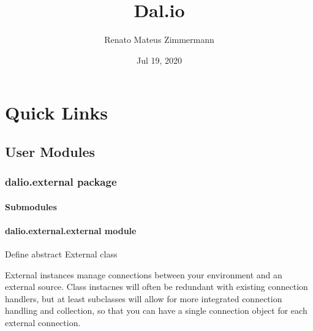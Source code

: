 \documentclass[letterpaper,10pt,english]{sphinxmanual}
\title{Dal.io}
\date{Jul 19, 2020}
\author{Renato Mateus Zimmermann}
\begin{document}
\pagestyle{empty}
\sphinxmaketitle
\pagestyle{plain}
\sphinxtableofcontents
\pagestyle{normal}
\label{\detokenize{index::doc}}



\chapter{Quick Links}
\label{\detokenize{index:quick-links}}

\section{User Modules}
\label{\detokenize{modules:user-modules}}\label{\detokenize{modules:modules}}\label{\detokenize{modules::doc}}

\subsection{dalio.external package}
\label{\detokenize{dalio.external:dalio-external-package}}\label{\detokenize{dalio.external::doc}}

\subsubsection{Submodules}
\label{\detokenize{dalio.external:submodules}}

\subsubsection{dalio.external.external module}
\label{\detokenize{dalio.external:module-dalio.external.external}}\label{\detokenize{dalio.external:dalio-external-external-module}}
Define abstract External class

External instances manage connections between your environment and an
external source. Class instacnes will often be redundant with existing
connection handlers, but at least subclasses will allow for more integrated
connection handling and collection, so that you can have a single connection
object for each external connection.
\end{document}
